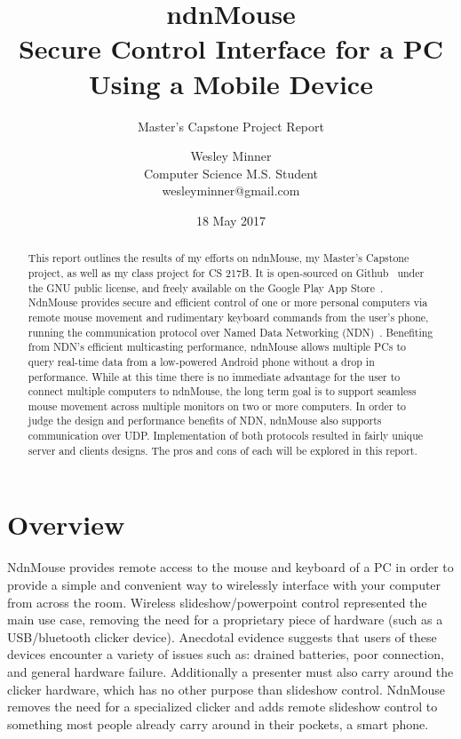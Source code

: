 \documentclass{sig-alternate}
\renewcommand\_{\textunderscore\allowbreak}  %
\begin{document}
	
\title{ndnMouse\\Secure Control Interface for a PC Using a Mobile Device}
\subtitle{Master's Capstone Project Report}
\author{
	Wesley Minner\\
	Computer Science M.S. Student\\
	wesleyminner@gmail.com
}

\date{18 May 2017}
\maketitle

\begin{abstract}
This report outlines the results of my efforts on ndnMouse, my Master's Capstone project, as well as my class project for CS 217B. It is open-sourced on Github~\cite{ndnMouseGH} under the GNU public license, and freely available on the Google Play App Store~\cite{ndnMouseGP}. NdnMouse provides secure and efficient control of one or more personal computers via remote mouse movement and rudimentary keyboard commands from the user's phone, running the communication protocol over Named Data Networking (NDN)~\cite{ndn}. Benefiting from NDN's efficient multicasting performance, ndnMouse allows multiple PCs to query real-time data from a low-powered Android phone without a drop in performance. While at this time there is no immediate advantage for the user to connect multiple computers to ndnMouse, the long term goal is to support seamless mouse movement across multiple monitors on two or more computers. In order to judge the design and performance benefits of NDN, ndnMouse also supports communication over UDP. Implementation of both protocols resulted in fairly unique server and clients designs. The pros and cons of each will be explored in this report.
\end{abstract}


\section{Overview}
\label{sec:overview}
NdnMouse provides remote access to the mouse and keyboard of a PC in order to provide a simple and convenient way to wirelessly interface with your computer from across the room. Wireless slideshow/powerpoint control represented the main use case, removing the need for a proprietary piece of hardware (such as a USB/bluetooth clicker device). Anecdotal evidence suggests that users of these devices encounter a variety of issues such as: drained batteries, poor connection, and general hardware failure. Additionally a presenter must also carry around the clicker hardware, which has no other purpose than slideshow control. NdnMouse removes the need for a specialized clicker and adds remote slideshow control to something most people already carry around in their pockets, a smart phone. 
\end{document}
